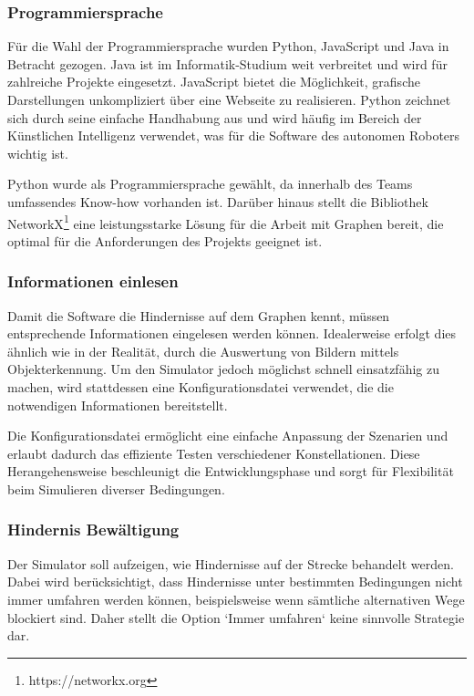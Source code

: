 \documentclass[../main.tex]{subfiles}
\begin{document}
\subsubsection{Programmiersprache}

Für die Wahl der Programmiersprache wurden Python, JavaScript und Java in Betracht gezogen. Java ist im Informatik-Studium weit verbreitet und wird für zahlreiche Projekte eingesetzt. JavaScript bietet die Möglichkeit, grafische Darstellungen unkompliziert über eine Webseite zu realisieren. Python zeichnet sich durch seine einfache Handhabung aus und wird häufig im Bereich der Künstlichen Intelligenz verwendet, was für die Software des autonomen Roboters wichtig ist.

Python wurde als Programmiersprache gewählt, da innerhalb des Teams umfassendes Know-how vorhanden ist. Darüber hinaus stellt die Bibliothek NetworkX\footnote{https://networkx.org} eine leistungsstarke Lösung für die Arbeit mit Graphen bereit, die optimal für die Anforderungen des Projekts geeignet ist.

\subsubsection{Informationen einlesen}

Damit die Software die Hindernisse auf dem Graphen kennt, müssen entsprechende Informationen eingelesen werden können. Idealerweise erfolgt dies ähnlich wie in der Realität, durch die Auswertung von Bildern mittels Objekterkennung. Um den Simulator jedoch möglichst schnell einsatzfähig zu machen, wird stattdessen eine Konfigurationsdatei verwendet, die die notwendigen Informationen bereitstellt.

Die Konfigurationsdatei ermöglicht eine einfache Anpassung der Szenarien und erlaubt dadurch das effiziente Testen verschiedener Konstellationen. Diese Herangehensweise beschleunigt die Entwicklungsphase und sorgt für Flexibilität beim Simulieren diverser Bedingungen.

\subsubsection{Hindernis Bewältigung}

Der Simulator soll aufzeigen, wie Hindernisse auf der Strecke behandelt werden.
Dabei wird berücksichtigt, dass Hindernisse unter bestimmten Bedingungen nicht immer umfahren werden können, beispielsweise wenn sämtliche alternativen Wege blockiert sind. Daher stellt die Option `Immer umfahren` keine sinnvolle Strategie dar.
\end{document}
